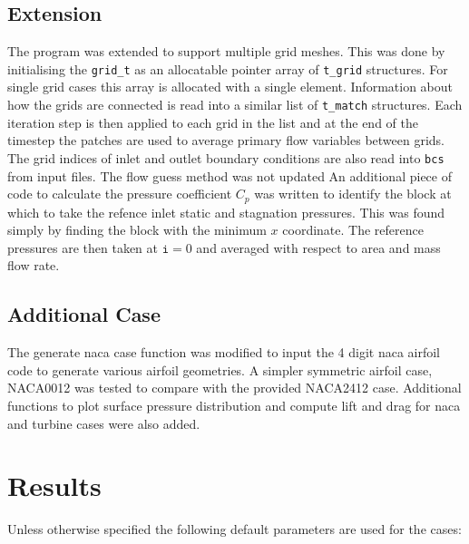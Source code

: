 \documentclass{article}
\begin{document}
\subsection{Extension}
The program was extended to support multiple grid meshes.
This was done by initialising the \texttt{grid\_t} as an allocatable pointer array of \texttt{t\_grid} structures.
For single grid cases this array is allocated with a single element.
Information about how the grids are connected is read into a similar list of \texttt{t\_match} structures.
Each iteration step is then applied to each grid in the list and at the end of the timestep the patches are used to average primary flow variables between grids.
The grid indices of inlet and outlet boundary conditions are also read into \texttt{bcs} from input files.
The flow guess method was not updated
An additional piece of code to calculate the pressure coefficient $C_p$ was written to identify the block at which to take the refence inlet static and stagnation pressures.
This was found simply by finding the block with the minimum $x$ coordinate.
The reference pressures are then taken at $\texttt{i}=0$ and averaged with respect to area and mass flow rate.

\subsection{Additional Case}
The generate naca case function was modified to input the 4 digit naca airfoil code to generate various airfoil geometries.
A simpler symmetric airfoil case, NACA0012 was tested to compare with the provided NACA2412 case.
Additional functions to plot surface pressure distribution and compute lift and drag for naca and turbine cases were also added.


\section{Results}

Unless otherwise specified the following default parameters are used for the cases:
\end{document}
